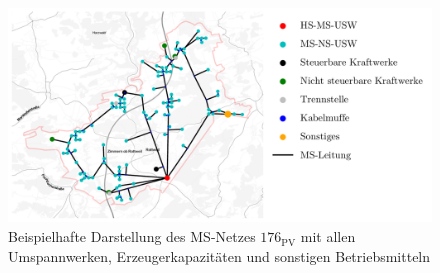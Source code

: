 \begin{figure}[H]
    \centering
    \includegraphics[width=\textwidth]{Bilder/grid_176_map}
    \caption[Beispielhafte Darstellung des MS-Netzes \num{176} mit allen Umspannwerken, Erzeugerkapazitäten und sonstigen Betriebsmitteln]{Beispielhafte Darstellung des MS-Netzes \(176_{\text{PV}}\) mit allen Umspannwerken, Erzeugerkapazitäten und sonstigen Betriebsmitteln}\label{fig:grid_176_map}
\end{figure}
